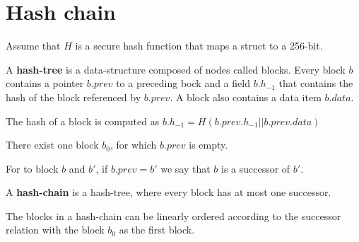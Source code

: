 
\section{Hash chain}

Assume that $H$ is a secure hash function that maps a struct to a 256-bit.

\begin{definition}
A \textbf{hash-tree} is a data-structure composed of nodes called blocks. 
Every block $b$ contains a pointer $b.prev$ to a preceding bock and a field $b.h_{-1}$ 
that contains the hash of the block referenced by $b.prev$.
A block also contains a data item $b.data$.

The hash of a block is computed as $b.h_{-1}=H(b.prev.h_{-1} || b.prev.data)$

There exist one block $b_0$, for which $b.prev$ is empty. 

For to block $b$ and $b'$, if $b.prev=b'$ we say that $b$ is a successor of $b'$.

A \textbf{hash-chain} is a hash-tree, where every block has at most one successor.
\end{definition}


\begin{lem}
The blocks in a hash-chain can be linearly ordered according to the successor relation with the block $b_0$ as the first block.
\end{lem}

